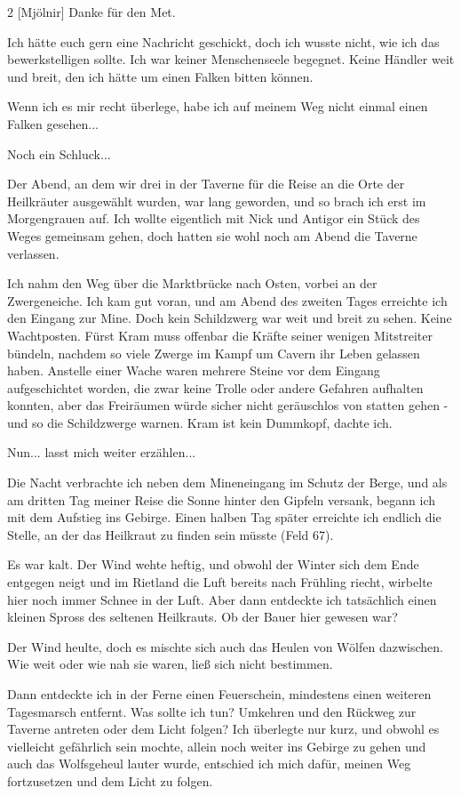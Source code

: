 \documentclass[10pt, a4paper, oneside]{book}
\begin{document}
\begin{multicols}{2}
[Mjölnir] Danke für den Met.

Ich hätte euch gern eine Nachricht geschickt, doch ich wusste nicht, wie ich das bewerkstelligen sollte. Ich war keiner Menschenseele begegnet. Keine Händler weit und breit, den ich hätte um einen Falken bitten können.

Wenn ich es mir recht überlege, habe ich auf meinem Weg nicht einmal einen Falken gesehen...

Noch ein Schluck...

Der Abend, an dem wir drei in der Taverne für die Reise an die Orte der Heilkräuter ausgewählt wurden, war lang geworden, und so brach ich erst im Morgengrauen auf. Ich wollte eigentlich mit Nick und Antigor ein Stück des Weges gemeinsam gehen, doch hatten sie wohl noch am Abend die Taverne verlassen.

Ich nahm den Weg über die Marktbrücke nach Osten, vorbei an der Zwergeneiche. Ich kam gut voran, und am Abend des zweiten Tages erreichte ich den Eingang zur Mine. Doch kein Schildzwerg war weit und breit zu sehen. Keine Wachtposten. Fürst Kram muss offenbar die Kräfte seiner wenigen Mitstreiter bündeln, nachdem so viele Zwerge im Kampf um Cavern ihr Leben gelassen haben. Anstelle einer Wache waren mehrere Steine vor dem Eingang aufgeschichtet worden, die zwar keine Trolle oder andere Gefahren aufhalten konnten, aber das Freiräumen würde sicher nicht geräuschlos von statten gehen - und so die Schildzwerge warnen. Kram ist kein Dummkopf, dachte ich.

Nun... lasst mich weiter erzählen...

Die Nacht verbrachte ich neben dem Mineneingang im Schutz der Berge, und als am dritten Tag meiner Reise die Sonne hinter den Gipfeln versank, begann ich mit dem Aufstieg ins Gebirge. Einen halben Tag später erreichte ich endlich die Stelle, an der das Heilkraut zu finden sein müsste (Feld 67).

Es war kalt. Der Wind wehte heftig, und obwohl der Winter sich dem Ende entgegen neigt und im Rietland die Luft bereits nach Frühling riecht, wirbelte hier noch immer Schnee in der Luft. Aber dann entdeckte ich tatsächlich einen kleinen Spross des seltenen Heilkrauts. Ob der Bauer hier gewesen war?

Der Wind heulte, doch es mischte sich auch das Heulen von Wölfen dazwischen. Wie weit oder wie nah sie waren, ließ sich nicht bestimmen.

Dann entdeckte ich in der Ferne einen Feuerschein, mindestens einen weiteren Tagesmarsch entfernt. Was sollte ich tun? Umkehren und den Rückweg zur Taverne antreten oder dem Licht folgen? Ich überlegte nur kurz, und obwohl es vielleicht gefährlich sein mochte, allein noch weiter ins Gebirge zu gehen und auch das Wolfsgeheul lauter wurde, entschied ich mich dafür, meinen Weg fortzusetzen und dem Licht zu folgen.


\end{multicols}
\end{document}
